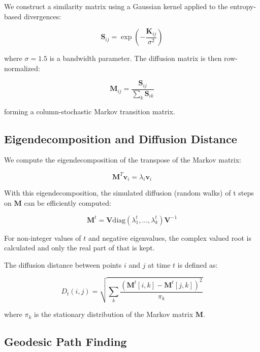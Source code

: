 \documentclass[12pt,a4paper]{article}
\begin{document}
We construct a similarity matrix using a Gaussian kernel applied to the entropy-based divergences:

\begin{equation}
\mathbf{S}_{ij} = \exp\left(-\frac{\mathbf{K}_{ij}}{\sigma^2}\right)
\end{equation}

where $\sigma = 1.5$ is a bandwidth parameter. The diffusion matrix is then row-normalized:

\begin{equation}
\mathbf{M}_{ij} = \frac{\mathbf{S}_{ij}}{\sum_{k} \mathbf{S}_{ik}}
\end{equation}

forming a column-stochastic Markov transition matrix.

\subsection{Eigendecomposition and Diffusion Distance}

We compute the eigendecomposition of the transpose of the Markov matrix:

\begin{equation}
\mathbf{M}^T \mathbf{v}_i = \lambda_i \mathbf{v}_i
\end{equation}

With this eigendecomposition, the simulated diffusion (random walks) of t steps on $\mathbf{M}$ can be efficiently computed:

\begin{equation}
\mathbf{M}^t = \mathbf{V} \text{diag}(\lambda_1^t, \ldots, \lambda_k^t) \mathbf{V}^{-1}
\end{equation}

For non-integer values of $t$ and negative eigenvalues, the complex valued root is calculated and only the real part of that is kept.

The diffusion distance between points $i$ and $j$ at time $t$ is defined as:

\begin{equation}
D_t(i,j) = \sqrt{\sum_{k} \frac{(\mathbf{M}^t[i,k] - \mathbf{M}^t[j,k])^2}{\pi_k}}
\end{equation}

where $\pi_k$ is the stationary distribution of the Markov matrix $\mathbf{M}$.

\subsection{Geodesic Path Finding}
\end{document}
